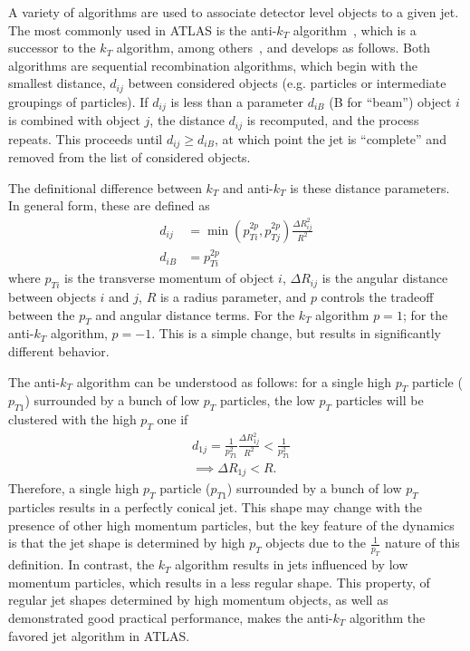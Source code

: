 A variety of algorithms are used to associate detector level objects to a given jet. The most commonly used 
in ATLAS is the anti-$k_{T}$ algorithm~\cite{Antikt}, which is a successor to the $k_{T}$ algorithm, among others~\cite{Jetography}, and develops as follows. Both algorithms are sequential recombination algorithms, which begin with the smallest distance, $d_{ij}$ between considered objects (e.g. particles or intermediate groupings of particles). If $d_{ij}$
is less than a parameter $d_{iB}$ (B for ``beam'') object $i$ is combined with object $j$, the distance $d_{ij}$ is recomputed, and the process repeats. This proceeds until $d_{ij} \geq d_{iB}$, at which point the jet is ``complete''
and removed from the list of considered objects.

The definitional difference between $k_{T}$ and anti-$k_{T}$ is these distance parameters. In 
general form, these are defined as 
\begin{align}
d_{ij} &= \min(p_{Ti}^{2p},p_{Tj}^{2p})\frac{\Delta R_{ij}^2}{R^2}\\
d_{iB} &= p_{Ti}^{2p}
\end{align}
where $p_{Ti}$ is the transverse momentum of object $i$, $\Delta R_{ij}$ is the angular distance between 
objects $i$ and $j$, $R$ is a radius parameter, and $p$ controls the tradeoff between the $p_{T}$ and angular 
distance terms. For the $k_{T}$ algorithm $p=1$; for the anti-$k_{T}$ algorithm, $p=-1$. This is a simple 
change, but results in significantly different behavior. 

The anti-$k_{T}$ algorithm can be understood as follows: for a single high $p_{T}$ particle ($p_{T1}$) 
surrounded by a bunch of low $p_{T}$ particles, the low $p_{T}$ particles will be clustered with the high $p_{T}$ one if
\begin{align}
&d_{1j} = \frac{1}{p_{T1}^2}\frac{\Delta R_{1j}^2}{R^2} < \frac{1}{p_{T1}^2}\\
&\implies \Delta R_{1j} < R.
\end{align}
Therefore, a single high $p_{T}$ particle ($p_{T1}$) surrounded by a bunch of low $p_{T}$ particles results 
in a perfectly conical jet. This shape may change with the presence of other high momentum particles, but the
key feature of the dynamics is that the jet shape is determined by high $p_{T}$ objects due to the $\frac{1}{p_{T}}$
nature of this definition. In contrast, the $k_{T}$ algorithm results in jets influenced by low momentum particles, 
which results in a less regular shape. This property, of regular jet shapes determined by high momentum objects, 
as well as demonstrated good practical performance, makes the anti-$k_{T}$ algorithm the favored jet algorithm in ATLAS.

